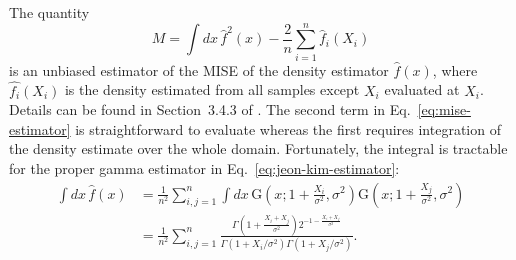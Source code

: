 \label{app:cross-validation}The quantity 
\begin{equation}
M=\int dx\,\hat{f}^{2}\left(x\right)-\frac{2}{n}\sum_{i=1}^{n}\hat{f}_{i}\left(X_{i}\right)\label{eq:mise-estimator}
\end{equation}
is an unbiased estimator of the MISE of the density estimator $\hat{f}\left(x\right)$, where $\hat{f_{i}}\left(X_{i}\right)$ is the density estimated from all samples except $X_{i}$ evaluated at $X_{i}$. Details can be found in Section~3.4.3 of \cite{Silverman1986}. The second term in Eq.~\eqref{eq:mise-estimator} is straightforward to evaluate whereas the first requires integration of the density estimate over the whole domain. Fortunately, the integral is tractable for the proper gamma estimator in Eq.~\eqref{eq:jeon-kim-estimator}:
\begin{align*}
\int dx\,\hat{f}\left(x\right) & =\frac{1}{n^{2}}\sum_{i,j=1}^{n}\int dx\,\mathrm{G}\left(x;1+\frac{X_{i}}{\sigma^{2}},\sigma^{2}\right)\mathrm{G}\left(x;1+\frac{X_{j}}{\sigma^{2}},\sigma^{2}\right)\\
 & =\frac{1}{n^{2}}\sum_{i,j=1}^{n}\frac{\Gamma\left(1+\frac{X_{i}+X_{j}}{\sigma^{2}}\right)2^{-1-\frac{X_{i}+X_{j}}{\sigma^{2}}}}{\Gamma\left(1+X_{i}/\sigma^{2}\right)\Gamma\left(1+X_{j}/\sigma^{2}\right)}.
\end{align*}





